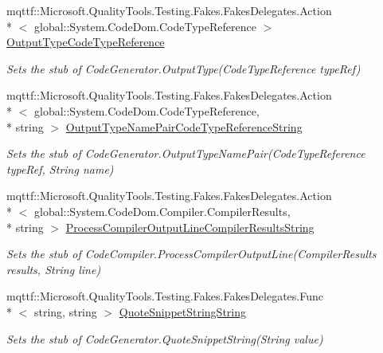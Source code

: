 \begin{DoxyCompactItemize}
mqttf\-::\-Microsoft.\-Quality\-Tools.\-Testing.\-Fakes.\-Fakes\-Delegates.\-Action\\*
$<$ global\-::\-System.\-Code\-Dom.\-Code\-Type\-Reference $>$ \hyperlink{class_system_1_1_code_dom_1_1_compiler_1_1_fakes_1_1_stub_code_compiler_ae87f3fc0156c5634ba209d28a81f09e9}{Output\-Type\-Code\-Type\-Reference}
\begin{DoxyCompactList}\small\item\em Sets the stub of Code\-Generator.\-Output\-Type(\-Code\-Type\-Reference type\-Ref)\end{DoxyCompactList}\item 
mqttf\-::\-Microsoft.\-Quality\-Tools.\-Testing.\-Fakes.\-Fakes\-Delegates.\-Action\\*
$<$ global\-::\-System.\-Code\-Dom.\-Code\-Type\-Reference, \\*
string $>$ \hyperlink{class_system_1_1_code_dom_1_1_compiler_1_1_fakes_1_1_stub_code_compiler_ac2e9a22a788c70aff90fcdcdf51a6be9}{Output\-Type\-Name\-Pair\-Code\-Type\-Reference\-String}
\begin{DoxyCompactList}\small\item\em Sets the stub of Code\-Generator.\-Output\-Type\-Name\-Pair(\-Code\-Type\-Reference type\-Ref, String name)\end{DoxyCompactList}\item 
mqttf\-::\-Microsoft.\-Quality\-Tools.\-Testing.\-Fakes.\-Fakes\-Delegates.\-Action\\*
$<$ global\-::\-System.\-Code\-Dom.\-Compiler.\-Compiler\-Results, \\*
string $>$ \hyperlink{class_system_1_1_code_dom_1_1_compiler_1_1_fakes_1_1_stub_code_compiler_ab8c7db030d2db9648fc0194fba2a7b71}{Process\-Compiler\-Output\-Line\-Compiler\-Results\-String}
\begin{DoxyCompactList}\small\item\em Sets the stub of Code\-Compiler.\-Process\-Compiler\-Output\-Line(\-Compiler\-Results results, String line)\end{DoxyCompactList}\item 
mqttf\-::\-Microsoft.\-Quality\-Tools.\-Testing.\-Fakes.\-Fakes\-Delegates.\-Func\\*
$<$ string, string $>$ \hyperlink{class_system_1_1_code_dom_1_1_compiler_1_1_fakes_1_1_stub_code_compiler_ae0388b8dc443b884f7ab55e73296d8c8}{Quote\-Snippet\-String\-String}
\begin{DoxyCompactList}\small\item\em Sets the stub of Code\-Generator.\-Quote\-Snippet\-String(\-String value)\end{DoxyCompactList}\item 

\end{DoxyCompactItemize}
